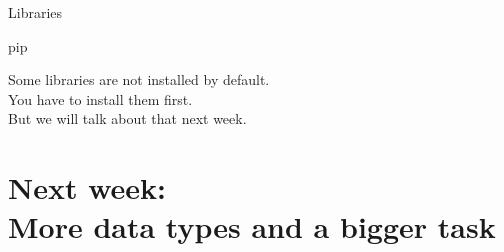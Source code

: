 \documentclass{beamer}
\begin{document}
\begin{frame}{Libraries}
    \begin{alertblock}{pip}

    \end{alertblock}
    Some libraries are not installed by default.\\
    You have to install them first.\\ \pause    
    But we will talk about that next week.
\end{frame}

\section{Next week:\\
 More data types and a bigger task}
\end{document}
